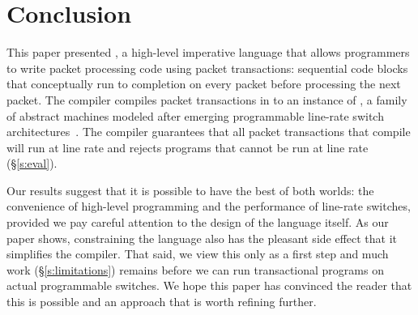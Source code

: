 \section{Conclusion}
\label{s:conclusion}

This paper presented \pktlanguage, a high-level imperative language that allows
programmers to write packet processing code using packet transactions:
sequential code blocks that conceptually run to completion on every packet
before processing the next packet. The \pktlanguage compiler compiles packet
transactions in \pktlanguage to an instance of \absmachine, a family of
abstract machines modeled after emerging programmable line-rate switch
architectures~\cite{intel, xpliant, rmt}. The compiler guarantees that all
packet transactions that compile will run at line rate and rejects \pktlanguage
programs that cannot be run at line rate (\S\ref{s:eval}).

Our results suggest that it is possible to have the best of both worlds: the
convenience of high-level programming and the performance of line-rate
switches, provided we pay careful attention to the design of the language
itself. As our paper shows, constraining the language also has the pleasant
side effect that it simplifies the compiler. That said, we view this only as a
first step and much work (\S\ref{s:limitations}) remains before we can run
transactional programs on actual programmable switches. We hope this paper has
convinced the reader that this is possible and an approach that is worth
refining further.

